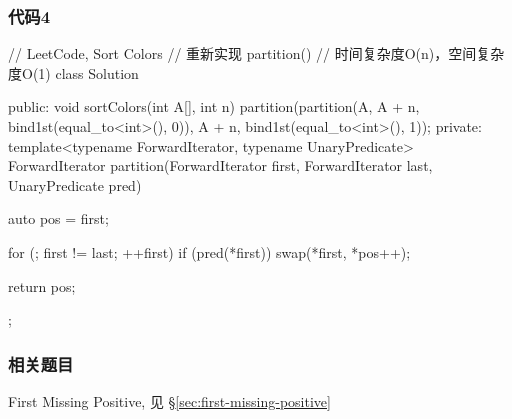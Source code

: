 \subsubsection{代码4}
\begin{Code}
// LeetCode, Sort Colors
// 重新实现 partition()
// 时间复杂度O(n)，空间复杂度O(1)
class Solution {
public:
    void sortColors(int A[], int n) {
        partition(partition(A, A + n, bind1st(equal_to<int>(), 0)), A + n,
                bind1st(equal_to<int>(), 1));
    }
private:
    template<typename ForwardIterator, typename UnaryPredicate>
    ForwardIterator partition(ForwardIterator first, ForwardIterator last,
            UnaryPredicate pred) {
        auto pos = first;

        for (; first != last; ++first)
            if (pred(*first))
                swap(*first, *pos++);

        return pos;
    }
};
\end{Code}


\subsubsection{相关题目}
\begindot
\item First Missing Positive, 见 \S \ref{sec:first-missing-positive}
\myenddot
